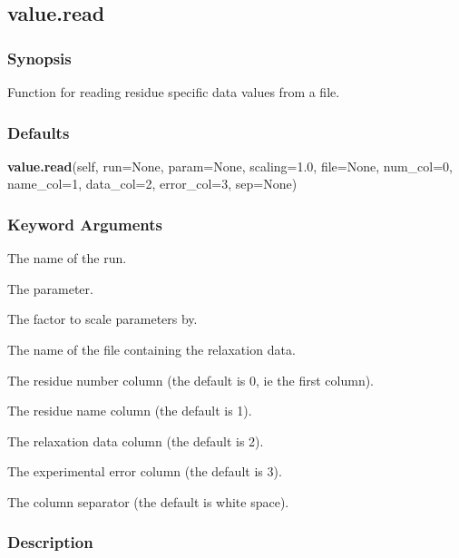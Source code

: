   

 \newpage 

 \subsection{value.read} 

  
 \subsubsection{Synopsis} 

 Function for reading residue specific data values from a file. 
  

  
 \subsubsection{Defaults} 

 \textsf{\textbf{value.read}(self, run=None, param=None, scaling=1.0, file=None, num\_col=0, name\_col=1, data\_col=2, error\_col=3, sep=None)} 

  
 \subsubsection{Keyword Arguments} 

   The name of the run.   

   The parameter.   

   The factor to scale parameters by.   

   The name of the file containing the relaxation data.   

   The residue number column (the default is 0, ie the first column).   

   The residue name column (the default is 1).   

   The relaxation data column (the default is 2).   

   The experimental error column (the default is 3).   

   The column separator (the default is white space).  

  

  
 \subsubsection{Description} 

